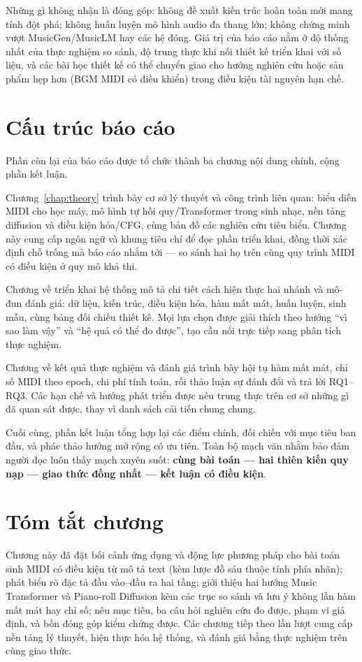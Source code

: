 Những gì không nhận là đóng góp: không đề xuất kiến trúc hoàn toàn mới mang tính đột phá; không huấn luyện mô hình audio đa thang lớn; không chứng minh vượt MusicGen/MusicLM hay các hệ đóng. Giá trị của báo cáo nằm ở độ thống nhất của thực nghiệm so sánh, độ trung thực khi nối thiết kế triển khai với số liệu, và các bài học thiết kế có thể chuyển giao cho hướng nghiên cứu hoặc sản phẩm hẹp hơn (BGM MIDI có điều khiển) trong điều kiện tài nguyên hạn chế.

\section{Cấu trúc báo cáo}
\label{sec:ch1-structure}

Phần còn lại của báo cáo được tổ chức thành ba chương nội dung chính, cộng phần kết luận.

Chương~\ref{chap:theory} trình bày cơ sở lý thuyết và công trình liên quan: biểu diễn MIDI cho học máy, mô hình tự hồi quy/Transformer trong sinh nhạc, nền tảng diffusion và điều kiện hóa/CFG, cùng bản đồ các nghiên cứu tiêu biểu. Chương này cung cấp ngôn ngữ và khung tiêu chí để đọc phần triển khai, đồng thời xác định chỗ trống mà báo cáo nhắm tới --- so sánh hai họ trên cùng quy trình MIDI có điều kiện ở quy mô khả thi.

Chương về triển khai hệ thống mô tả chi tiết cách hiện thực hai nhánh và mô-đun đánh giá: dữ liệu, kiến trúc, điều kiện hóa, hàm mất mát, huấn luyện, sinh mẫu, cùng bảng đối chiếu thiết kế. Mọi lựa chọn được giải thích theo hướng ``vì sao làm vậy'' và ``hệ quả có thể đo được'', tạo cầu nối trực tiếp sang phân tích thực nghiệm.

Chương về kết quả thực nghiệm và đánh giá trình bày hội tụ hàm mất mát, chỉ số MIDI theo epoch, chi phí tính toán, rồi thảo luận sự đánh đổi và trả lời RQ1--RQ3. Các hạn chế và hướng phát triển được nêu trung thực trên cơ sở những gì đã quan sát được, thay vì danh sách cải tiến chung chung.

Cuối cùng, phần kết luận tổng hợp lại các điểm chính, đối chiếu với mục tiêu ban đầu, và phác thảo hướng mở rộng có ưu tiên. Toàn bộ mạch văn nhằm bảo đảm người đọc luôn thấy mạch xuyên suốt: \textbf{cùng bài toán --- hai thiên kiến quy nạp --- giao thức đồng nhất --- kết luận có điều kiện}.

\section*{Tóm tắt chương}

Chương này đã đặt bối cảnh ứng dụng và động lực phương pháp cho bài toán sinh MIDI có điều kiện từ mô tả text (kèm lược đồ sáu thuộc tính phía nhãn); phát biểu rõ đặc tả đầu vào--đầu ra hai tầng; giới thiệu hai hướng Music Transformer và Piano-roll Diffusion kèm các trục so sánh và lưu ý không lẫn hàm mất mát hay chỉ số; nêu mục tiêu, ba câu hỏi nghiên cứu đo được, phạm vi giả định, và bốn đóng góp kiểm chứng được. Các chương tiếp theo lần lượt cung cấp nền tảng lý thuyết, hiện thực hóa hệ thống, và đánh giá bằng thực nghiệm trên cùng giao thức.
